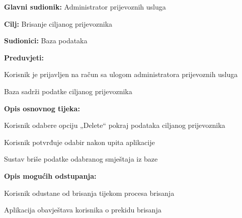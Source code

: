 					\noindent {}
					\begin{packed_item}
						\item \textbf{Glavni sudionik:} Administrator prijevoznih usluga
						\item  \textbf{Cilj:} Brisanje ciljanog prijevoznika
						\item  \textbf{Sudionici:} Baza podataka
						\item  \textbf{Preduvjeti:}
						\item[] \begin{packed_enum}
							\item Korisnik je prijavljen na račun sa ulogom administratora prijevoznih usluga
							\item Baza sadrži podatke ciljanog prijevoznika
						\end{packed_enum}
						
						\item  \textbf{Opis osnovnog tijeka:}
						\item[] \begin{packed_enum}
							\item Korisnik odabere opciju „Delete“ pokraj podataka ciljanog prijevoznika
							\item Korisnik potvrđuje odabir nakon upita aplikacije
							\item Sustav briše podatke odabranog smještaja iz baze
						\end{packed_enum}
					
						\item  \textbf{Opis mogućih odstupanja:}
						\item[] \begin{packed_item}
							\item[2.a] Korisnik odustane od brisanja tijekom procesa brisanja
							\item[] \begin{packed_enum}
								\item Aplikacija obavještava korisnika o prekidu brisanja
							\end{packed_enum}
						\end{packed_item}
					\end{packed_item}
					
